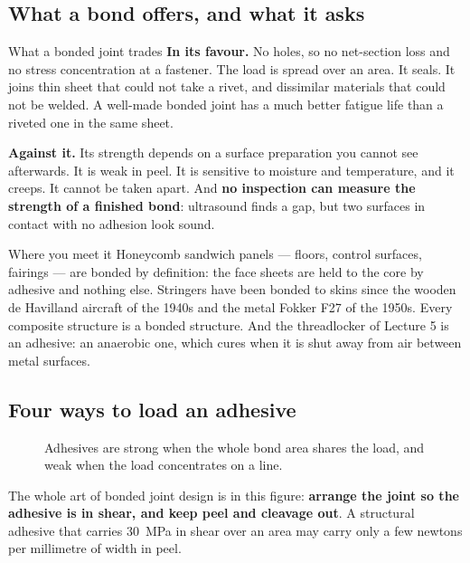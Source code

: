 \documentclass[11pt,a4paper]{article}
\begin{document}
\subsection{What a bond offers, and what it asks}

\begin{keybox}{What a bonded joint trades}
\textbf{In its favour.} No holes, so no net-section loss and no stress concentration at a
fastener. The load is spread over an area. It seals. It joins thin sheet that could not take a
rivet, and dissimilar materials that could not be welded. A well-made bonded joint has a much
better fatigue life than a riveted one in the same sheet.

\medskip
\textbf{Against it.} Its strength depends on a surface preparation you cannot see afterwards. It is
weak in peel. It is sensitive to moisture and temperature, and it creeps. It cannot be taken
apart. And \textbf{no inspection can measure the strength of a finished bond}: ultrasound finds a
gap, but two surfaces in contact with no adhesion look sound.
\end{keybox}

\begin{aerobox}{Where you meet it}
Honeycomb sandwich panels --- floors, control surfaces, fairings --- are bonded by definition: the
face sheets are held to the core by adhesive and nothing else. Stringers have been bonded to skins
since the wooden de Havilland aircraft of the 1940s and the metal Fokker F27 of the 1950s. Every
composite structure is a bonded structure. And the threadlocker of Lecture 5 is an adhesive: an
anaerobic one, which cures when it is shut away from air between metal surfaces.
\end{aerobox}

\subsection{Four ways to load an adhesive}

\begin{figure}[H]\centering
\resizebox{\textwidth}{!}{}
\caption{Adhesives are strong when the whole bond area shares the load, and weak when the load
concentrates on a line.}
\label{fig:modes}
\end{figure}

The whole art of bonded joint design is in this figure: \textbf{arrange the joint so the adhesive
is in shear, and keep peel and cleavage out}. A structural adhesive that carries
\SI{30}{MPa} in shear over an area may carry only a few newtons per millimetre of width in peel.
\end{document}
